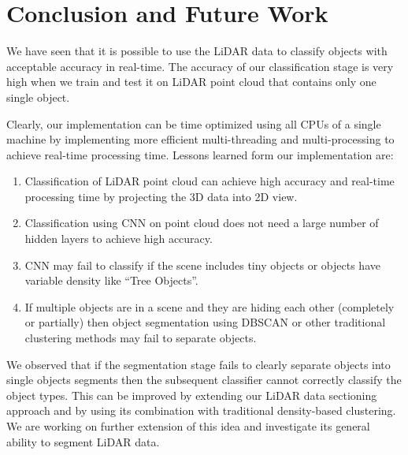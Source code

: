\section{Conclusion and Future Work}\label{sec:conclusion}
We have seen that it is possible to use the LiDAR data to classify objects with acceptable accuracy in real-time.
The accuracy of our classification stage is very high when we train and test it on LiDAR point cloud that contains only one single object.


Clearly, our implementation can be time optimized using all CPUs of a single machine by implementing more efficient multi-threading and multi-processing to achieve real-time processing time.  Lessons learned form our implementation are:
\begin{enumerate}
  \item Classification of LiDAR point cloud can achieve high accuracy and real-time processing time by projecting the 3D data into 2D view.
  \item Classification using CNN on point cloud does not need a large number of hidden layers to achieve high accuracy.
  \item CNN may fail to classify if the scene includes tiny objects or objects have variable density like ``Tree Objects''.
  \item If multiple objects are in a scene and they are hiding each other (completely or partially) then object segmentation using DBSCAN or other traditional clustering methods may fail to separate objects.
\end{enumerate}

We observed that if the segmentation stage fails to clearly separate objects into single objects segments then the subsequent classifier cannot correctly classify the object types. This can be improved by extending our LiDAR data sectioning approach and by using its combination with traditional density-based clustering. We are working on further extension of this idea and investigate its general ability to segment LiDAR data.  
